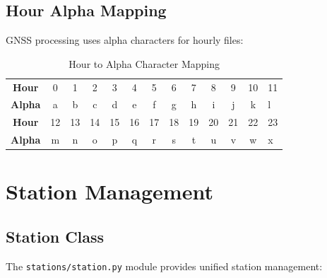 \documentclass[11pt,a4paper,twoside]{report}
\newcommand{\pyfile}[1]{\texttt{\color{primaryblue!80!black}#1}}
\begin{document}
\section{Hour Alpha Mapping}

GNSS processing uses alpha characters for hourly files:

\begin{table}[H]
\centering
\caption{Hour to Alpha Character Mapping}
\label{tab:hour-alpha}
\begin{tabular}{@{}cccccccccccc@{}}
\toprule
\textbf{Hour} & 0 & 1 & 2 & 3 & 4 & 5 & 6 & 7 & 8 & 9 & 10 & 11 \\
\textbf{Alpha} & a & b & c & d & e & f & g & h & i & j & k & l \\
\midrule
\textbf{Hour} & 12 & 13 & 14 & 15 & 16 & 17 & 18 & 19 & 20 & 21 & 22 & 23 \\
\textbf{Alpha} & m & n & o & p & q & r & s & t & u & v & w & x \\
\bottomrule
\end{tabular}
\end{table}

\chapter{Station Management}

\section{Station Class}

The \pyfile{stations/station.py} module provides unified station management:
\end{document}
